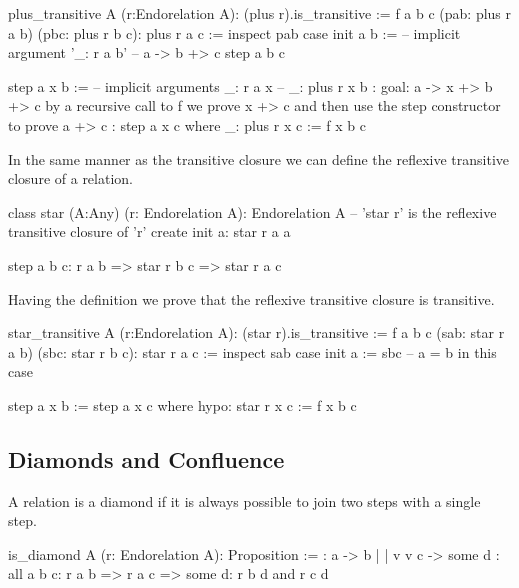 \begin{alba}
  plus_transitive A (r:Endorelation A): (plus r).is_transitive :=
    f a b c (pab: plus r a b) (pbc: plus r b c): plus r a c :=
      inspect
        pab
      case
        init a b :=   -- implicit argument '_: r a b'
            -- a -> b +> c
          step a b c

        step a x b :=
            -- implicit arguments _:  r a x
            --                    _: plus r x b
            {: goal: a -> x +> b +> c
               by a recursive call to f we prove x +> c
               and then use the step constructor to prove a +> c :}
          step a x c
          where
             _: plus r x c := f x b c
\end{alba}



In the same manner as the transitive closure we can define the reflexive
transitive closure of a relation.

\begin{alba}
  class
    star (A:Any) (r: Endorelation A): Endorelation A
      -- 'star r' is the reflexive transitive closure of 'r'
  create
    init a:
      star r a a

    step a b c:
      r a b
      => star r b c
      => star r a c
\end{alba}

Having the definition we prove that the reflexive transitive closure is
transitive.

\begin{alba}
  star_transitive A (r:Endorelation A): (star r).is_transitive :=
    f a b c (sab: star r a b) (sbc: star r b c): star r a c :=
      inspect
        sab
      case
        init a :=
          sbc  -- a = b in this case

        step a x b :=
          step a x c where
            hypo: star r x c := f x b c
\end{alba}


\subsection{Diamonds and Confluence}


A relation is a diamond if it is always possible to join two steps with a
single step.

\begin{alba}
  is_diamond A (r: Endorelation A): Proposition :=
      {:   a  ->  b
           |      |
           v      v
           c  -> some d :}
    all a b c:
      r a b
      => r a c
      => some d: r b d and r c d
\end{alba}


